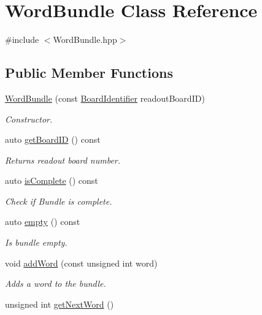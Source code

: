 \hypertarget{class_word_bundle}{}\section{Word\+Bundle Class Reference}
\label{class_word_bundle}


{\ttfamily \#include $<$Word\+Bundle.\+hpp$>$}

\subsection*{Public Member Functions}
\begin{DoxyCompactItemize}
\item 
\hyperlink{class_word_bundle_a7c01d89d6ce8c10d23c1134661f2c44a}{Word\+Bundle} (const \hyperlink{class_board_identifier}{Board\+Identifier} readout\+Board\+ID)
\begin{DoxyCompactList}\small\item\em Constructor. \end{DoxyCompactList}\item 
auto \hyperlink{class_word_bundle_afa38c6a44582d1113b9d492bb72dc9ef}{get\+Board\+ID} () const
\begin{DoxyCompactList}\small\item\em Returns readout board number. \end{DoxyCompactList}\item 
auto \hyperlink{class_word_bundle_a3afd16d04f92eec06e08a6ec59028ae9}{is\+Complete} () const
\begin{DoxyCompactList}\small\item\em Check if Bundle is complete. \end{DoxyCompactList}\item 
auto \hyperlink{class_word_bundle_ab46858414d852c8d4079c4f611f4c96c}{empty} () const
\begin{DoxyCompactList}\small\item\em Is bundle empty. \end{DoxyCompactList}\item 
void \hyperlink{class_word_bundle_a167d2b6b4f504e4347191a8e5bb47e5e}{add\+Word} (const unsigned int word)
\begin{DoxyCompactList}\small\item\em Adds a word to the bundle. \end{DoxyCompactList}\item 
unsigned int \hyperlink{class_word_bundle_a950e328fdf8b00e59b2d68da5182763f}{get\+Next\+Word} ()

\end{DoxyCompactItemize}
